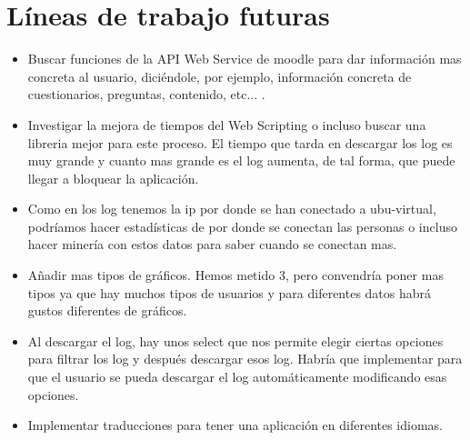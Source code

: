 \section{Líneas de trabajo futuras}\label{luxedneas-de-trabajo-futuras}

\begin{itemize}
	\tightlist
	\item
	Buscar funciones de la API Web Service de moodle para dar información mas concreta al usuario, diciéndole, por ejemplo, información concreta de cuestionarios, preguntas, contenido, etc... .
	\item
	Investigar la mejora de tiempos del Web Scripting o incluso buscar una libreria mejor para este proceso. El tiempo que tarda en descargar los log es muy grande y cuanto mas grande es el log aumenta, de tal forma, que puede llegar a bloquear la aplicación.
	\item
	Como en los log tenemos la ip por donde se han conectado a ubu-virtual, podríamos hacer estadísticas de por donde se conectan las personas o incluso hacer minería con estos datos para saber cuando se conectan mas.
	\item
	Añadir mas tipos de gráficos. Hemos metido 3, pero convendría poner mas tipos ya que hay muchos tipos de usuarios y para diferentes datos habrá gustos diferentes de gráficos.
	\item
	Al descargar el log, hay unos select que nos permite elegir ciertas opciones para filtrar los log y después descargar esos log. Habría que implementar para que el usuario se pueda descargar el log automáticamente modificando esas opciones.
	\item
	Implementar traducciones para tener una aplicación en diferentes idiomas.
	
\end{itemize}
